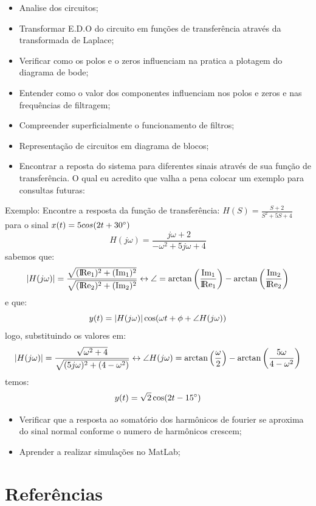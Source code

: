 \documentclass[a4paper, 12pt]{article}
\begin{document}
		\begin{itemize}
			\item Analise dos circuitos;
			\item Transformar E.D.O do circuito em funções de transferência através da transformada de Laplace;
			\item Verificar como os polos e o zeros influenciam na pratica a plotagem do diagrama de bode;
			\item Entender como o valor dos componentes influenciam nos polos e zeros e nas frequências de filtragem;
			\item Compreender superficialmente o funcionamento de filtros;
			\item Representação de circuitos em diagrama de blocos;
			\item Encontrar a reposta do sistema para diferentes sinais através de sua função de transferência. O qual eu acredito que valha a pena colocar um exemplo para consultas futuras:
		\end{itemize}	
		Exemplo: Encontre a resposta da função de transferência:
		$H(S) = \frac{S+2}{S^{2} + 5S + 4}$ para o sinal $x(t) = 5cos(2t + 30\degree)$
		\[
			H(j\omega) = \frac{j\omega + 2}{-\omega^{2} + 5j\omega + 4}
		\]
		sabemos que:
		\[
		\arrowvert H(j\omega) \arrowvert = \frac{\sqrt{(\rm I\!Re_{1})^{2} + (\rm Im_{1})^{2}}}{\sqrt{(\rm I\!Re_{2})^{2} + (\rm Im_{2})^{2}}} \leftrightarrow \angle = \arctan\left(\frac{\rm Im_{1}}{\rm I\!Re_{1}}\right) - \arctan\left(\frac{\rm Im_{2}}{\rm I\!Re_{2}}\right)
		\]			
		e que:
		\[
		y(t) = \arrowvert H(j\omega) \arrowvert \cos(\omega t + \phi + \angle H(j\omega))
		\]			
		logo, substituindo os valores em:
		\[
		\arrowvert H(j\omega) \arrowvert = \frac{\sqrt{\omega^{2} + 4}}{\sqrt{(5j\omega)^{2} + (4 - \omega^{2})}} \leftrightarrow \angle H(j\omega) = \arctan\left(\frac{\omega}{2}\right) - \arctan\left(\frac{5\omega}{4 - \omega^{2}}\right)
		\]		
		temos:
		\[
		y(t) = \sqrt{2}\cos(2t - 15\degree)
		\]		
		\begin{itemize}
			\item Verificar que a resposta ao somatório dos harmônicos de fourier se aproxima do sinal normal conforme o numero de harmônicos crescem;
			\item Aprender a realizar simulações no MatLab;

		\end{itemize}			
	
	\newpage
	\section{Referências}
	
\end{document}
